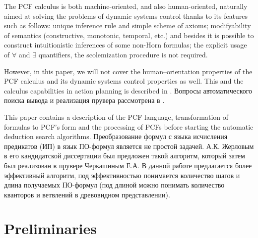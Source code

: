 \documentclass[a4paper,12pt]{article}
\begin{document}
The PCF calculus is both machine-oriented, and also human-oriented, naturally aimed at solving the problems of dynamic systems control thanks to its features such as follows: unique inference rule and simple scheme of axioms; modifyability of semantics (constructive, monotonic, temporal, etc.) and besides it is possible to construct intuitionistic inferences of some non-Horn formulas; the explicit usage of $\forall$ and $\exists$ quantifiers, the scolemization procedure is not required.

However, in this paper, we will not cover the human--orientation properties of the PCF calculus and its dynamic systems control properties as well.  This and the calculus capabilities in action planning is described in \cite{ICDS2000}. Вопросы автоматического поиска вывода и реализация прувера рассмотрена в  \cite{mipro2013}. 

This paper contains a description of the PCF language, transformation of formulas to PCF's form and the processing of PCFs before starting the automatic deduction search algorithms. Преобразование формул с языка исчисления предикатов (ИП) в язык ПО-формул является не простой задачей. А.К. Жерловым в его кандидатской диссертации был предложен такой алгоритм, который затем был реализован в прувере Черкашиным Е.А. В данной работе предлагается более эффективный алгоритм, под эффективностью понимается количество шагов и длина получаемых ПО-формул (под длиной можно понимать количество кванторов и ветвлений в древовидном представлении).




\section{Preliminaries}
\end{document}
